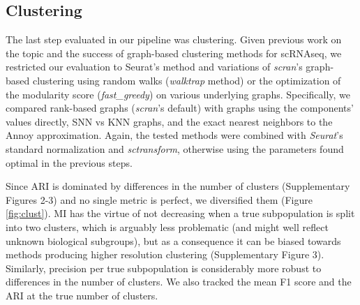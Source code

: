 \documentclass{bmcart}
\begin{document}
\subsection*{Clustering}

The last step evaluated in our pipeline was clustering. Given previous work on the topic \cite{duoClustering2018,freytagComparison2018} and the success of graph-based clustering methods for scRNAseq, we restricted our evaluation to Seurat's method and variations of \textit{scran}'s graph-based clustering using random walks (\textit{walktrap} method) or the optimization of the modularity score (\textit{fast\_greedy}) on various underlying graphs. Specifically, we compared rank-based graphs (\textit{scran}'s default) with graphs using the components' values directly, SNN vs KNN graphs, and the exact nearest neighbors to the Annoy approximation. Again, the tested methods were combined with \textit{Seurat}'s standard normalization and \textit{sctransform}, otherwise using the parameters found optimal in the previous steps. 

Since ARI is dominated by differences in the number of clusters (Supplementary Figures 2-3) and no single metric is perfect, we diversified them (Figure \ref{fig:clust}). MI has the virtue of not decreasing when a true subpopulation is split into two clusters, which is arguably less problematic (and might well reflect unknown biological subgroups), but as a consequence it can be biased towards methods producing higher resolution clustering (Supplementary Figure 3). Similarly, precision per true subpopulation is considerably more robust to differences in the number of clusters. We also tracked the mean F1 score and the ARI at the true number of clusters. 
\end{document}

